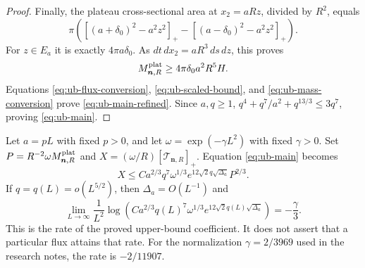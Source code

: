 \begin{proof}
Finally, the plateau cross-sectional area at $x_2=aRz$, divided by
$R^2$, equals
\[
 \pi\left(
 [(a+\delta_0)^2-a^2z^2]_+
 -[(a-\delta_0)^2-a^2z^2]_+\right).
\]
For $z\in E_a$ it is exactly $4\pi a\delta_0$.  As
$dt\,dx_2=aR^3\,ds\,dz$, this proves
\begin{equation}\label{eq:ub-mass-conversion}
 M^{\rm plat}_{\boldsymbol n,R}\ge4\pi\delta_0a^2R^5H.
\end{equation}
Equations \eqref{eq:ub-flux-conversion}, \eqref{eq:ub-scaled-bound},
and \eqref{eq:ub-mass-conversion} prove
\eqref{eq:ub-main-refined}.  Since $a,q\ge1$,
$q^4+q^7/a^2+q^{13/3}\le3q^7$, proving \eqref{eq:ub-main}.
\end{proof}

\begin{remark}\label{rem:ub-window}
Let $a=pL$ with fixed $p>0$, and let
$\omega=\exp(-\gamma L^2)$ with fixed $\gamma>0$.  Set
$P=R^{-2}\omega M^{\rm plat}_{\boldsymbol n,R}$ and
$X=(\omega/R)[\mathcal T_{\boldsymbol n,R}]_+$.
Equation \eqref{eq:ub-main} becomes
\[
 X\le C a^{2/3}q^7\omega^{1/3}e^{12\sqrt2q\sqrt{\Delta_a}}P^{2/3}.
\]
If $q=q(L)=o(L^{5/2})$, then $\Delta_a=O(L^{-1})$ and
\[
 \lim_{L\to\infty}\frac1{L^2}
   \log\left(Ca^{2/3}q(L)^7\omega^{1/3}
                   e^{12\sqrt2q(L)\sqrt{\Delta_a}}\right)
 =-\frac\gamma3.
\]
This is the rate of the proved upper-bound coefficient.  It does not
assert that a particular flux attains that rate.  For the normalization
$\gamma=2/3969$ used in the research notes, the rate is $-2/11907$.
\end{remark}
